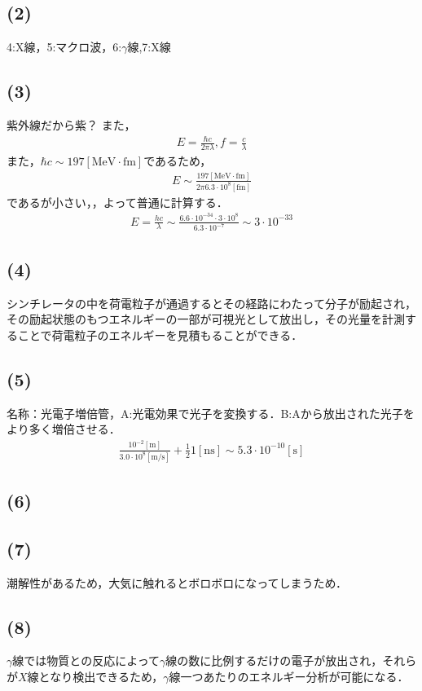 \documentclass[12pt,dvipdfmx]{jsarticle}
\begin{document}
\subsection*{(2)}
4:X線，5:マクロ波，6:$\gamma$線,7:X線
\subsection*{(3)}
紫外線だから紫？
また，
\begin{eqnarray}
  E = \frac{\hbar c}{2\pi\lambda}, f = \frac{c}{\lambda}
\end{eqnarray}
また，$\hbar c\sim 197[\text{MeV}\cdot \text{fm}]$であるため，
\begin{eqnarray}
  E \sim \frac{197[\text{MeV}\cdot \text{fm}]}{2\pi 6.3\cdot 10^8 [\text{fm}]}
\end{eqnarray}
であるが小さい，，よって普通に計算する．
\begin{eqnarray}
  E = \frac{hc}{\lambda} \sim \frac{6.6\cdot 10^{-34}\cdot 3\cdot 10^8}{6.3\cdot 10^{-7}} \sim 3\cdot 10^{-33}
\end{eqnarray}
\subsection*{(4)}
シンチレータの中を荷電粒子が通過するとその経路にわたって分子が励起され，その励起状態のもつエネルギーの一部が可視光として放出し，その光量を計測することで荷電粒子のエネルギーを見積もることができる．
\subsection*{(5)}
名称：光電子増倍管，A:光電効果で光子を変換する．B:Aから放出された光子をより多く増倍させる．
\begin{eqnarray}
  \frac{10^{-2}[\text{m}]}{3.0\cdot 10^{8}[\text{m/s}]} + \frac{1}{2}1[\text{ns}] \sim 5.3\cdot 10^{-10}[\text{s}]
\end{eqnarray}
\subsection*{(6)}
\subsection*{(7)}
潮解性があるため，大気に触れるとボロボロになってしまうため．
\subsection*{(8)}
$\gamma$線では物質との反応によって$\gamma$線の数に比例するだけの電子が放出され，それらが$X$線となり検出できるため，$\gamma$線一つあたりのエネルギー分析が可能になる．
\end{document}
